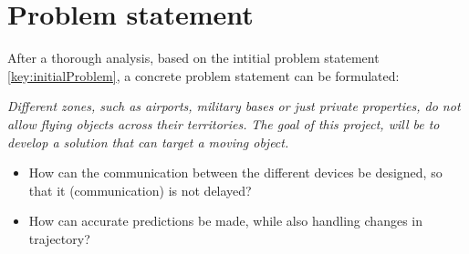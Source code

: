 \newpage
\section{Problem statement}
After a thorough analysis, based on the intitial problem statement \ref{key:initialProblem}, a concrete problem statement can be formulated:
\begin{center}
	\textit{Different zones, such as airports, military bases or just private properties, do not allow flying objects across their territories.}
	\textit{The goal of this project, will be to develop a solution that can target a moving object.}

\begin{itemize}
	\item How can the communication between the different devices be designed, so that it (communication) is not delayed? 
	\item How can accurate predictions be made, while also handling changes in trajectory?
\end{itemize}
\end{center}